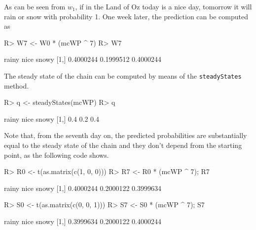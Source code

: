 \documentclass[article,nojss]{jss}
\begin{document}
As can be seen from \(w_{1}\), if in the Land of Oz today is a nice day, tomorrow it will rain or snow with probability 1. One week later, the prediction can be computed as

\begin{CodeChunk}

\begin{CodeInput}
R> W7 <- W0 * (mcWP ^ 7)
R> W7
\end{CodeInput}

\begin{CodeOutput}
         rainy      nice     snowy
[1,] 0.4000244 0.1999512 0.4000244
\end{CodeOutput}
\end{CodeChunk}

The steady state of the chain can be computed by means of the \texttt{steadyStates} method.

\begin{CodeChunk}

\begin{CodeInput}
R> q <- steadyStates(mcWP)
R> q
\end{CodeInput}

\begin{CodeOutput}
     rainy nice snowy
[1,]   0.4  0.2   0.4
\end{CodeOutput}
\end{CodeChunk}

Note that, from the seventh day on, the predicted probabilities are substantially equal to the steady state of the chain and they don't depend from the starting point, as the following code shows.

\begin{CodeChunk}

\begin{CodeInput}
R> R0 <- t(as.matrix(c(1, 0, 0)))
R> R7 <- R0 * (mcWP ^ 7); R7
\end{CodeInput}

\begin{CodeOutput}
         rainy      nice     snowy
[1,] 0.4000244 0.2000122 0.3999634
\end{CodeOutput}

\begin{CodeInput}
R> S0 <- t(as.matrix(c(0, 0, 1)))
R> S7 <- S0 * (mcWP ^ 7); S7
\end{CodeInput}

\begin{CodeOutput}
         rainy      nice     snowy
[1,] 0.3999634 0.2000122 0.4000244
\end{CodeOutput}
\end{CodeChunk}
\end{document}
